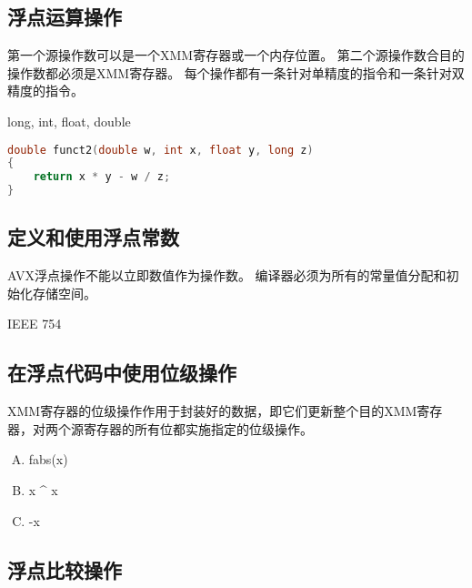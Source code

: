 {    \subsection{浮点运算操作}
    {
        第一个源操作数可以是一个XMM寄存器或一个内存位置。
        第二个源操作数合目的操作数都必须是XMM寄存器。
        每个操作都有一条针对单精度的指令和一条针对双精度的指令。

        \begin{practicec}
            long, int, float, double
        \end{practicec}

        \begin{practicec}
            \begin{lstlisting}[language=C]
double funct2(double w, int x, float y, long z)
{
    return x * y - w / z;
}
            \end{lstlisting}
        \end{practicec}
    }

    \subsection{定义和使用浮点常数}
    {
        AVX浮点操作不能以立即数值作为操作数。
        编译器必须为所有的常量值分配和初始化存储空间。

        \begin{practicec}
            IEEE 754
        \end{practicec}
    }

    \subsection{在浮点代码中使用位级操作}
    {
        XMM寄存器的位级操作作用于封装好的数据，即它们更新整个目的XMM寄存器，对两个源寄存器的所有位都实施指定的位级操作。

        \begin{practicec}
            \begin{enumerate}[A.]
                \item fabs(x)
                \item x ^ x
                \item -x
            \end{enumerate}
        \end{practicec}
    }

    \subsection{浮点比较操作}
    {

    }
}
